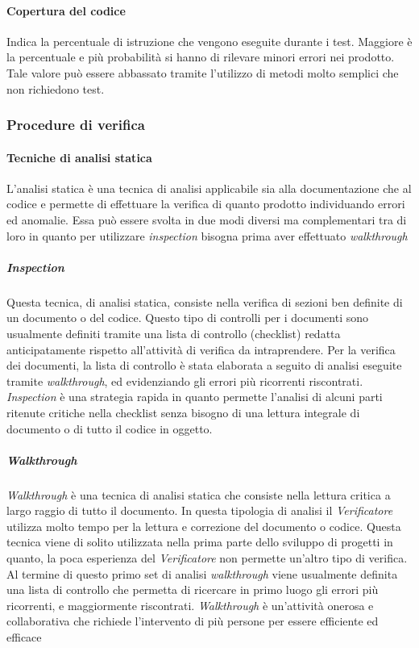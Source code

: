 \paragraph{Copertura del codice}
Indica la percentuale di istruzione che vengono eseguite durante i test. Maggiore è la percentuale e più probabilità si hanno di rilevare minori errori nei prodotto. Tale valore può essere abbassato tramite l'utilizzo di metodi molto semplici che non richiedono test.\\
\subsubsection{Procedure di verifica}
\paragraph{Tecniche di analisi statica}
L'analisi statica è una tecnica di analisi applicabile sia alla documentazione che al codice e permette di effettuare la verifica di quanto prodotto individuando errori ed anomalie. Essa può essere svolta in due modi diversi ma complementari tra di loro in quanto per utilizzare \textit{inspection} bisogna prima aver effettuato \textit{walkthrough}
\subparagraph{Inspection}
Questa tecnica, di analisi statica, consiste nella verifica di sezioni ben definite di un documento o del codice. Questo tipo di controlli per i documenti sono usualmente definiti tramite una lista di controllo (checklist) redatta anticipatamente rispetto all'attività di verifica da intraprendere. Per la verifica dei documenti, la lista di controllo è stata elaborata a seguito di analisi eseguite tramite \textit{walkthrough}, ed evidenziando gli errori più ricorrenti riscontrati. \textit{Inspection} è una strategia rapida in quanto permette l'analisi di alcuni parti ritenute critiche nella checklist senza bisogno di una lettura integrale di documento o di tutto il codice in oggetto.
\subparagraph{Walkthrough}
\textit{Walkthrough} è una tecnica di analisi statica che consiste nella lettura critica a largo raggio di tutto il documento. In questa tipologia di analisi il \textit{Verificatore} utilizza molto tempo per la lettura e correzione del documento o codice. Questa tecnica viene di solito utilizzata nella prima parte dello sviluppo di progetti in quanto, la poca esperienza del \textit{Verificatore} non permette un'altro tipo di verifica. Al termine di questo primo set di analisi \textit{walkthrough} viene usualmente definita una lista di controllo che permetta di ricercare in primo luogo gli errori più ricorrenti, e maggiormente riscontrati. \textit{Walkthrough} è un'attività onerosa e collaborativa che richiede l'intervento di più persone per essere efficiente ed efficace
